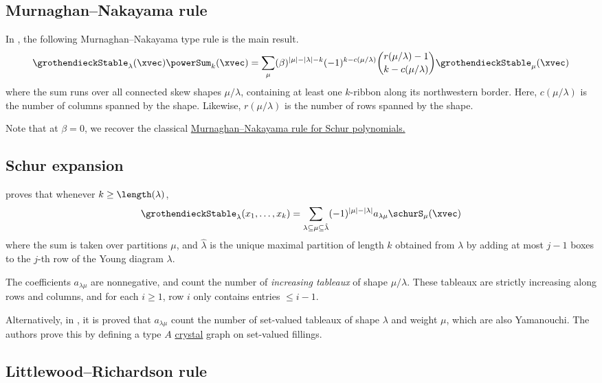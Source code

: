 \subsection[grothendieckStableMN]{Murnaghan--Nakayama rule}

In \cite{NguyenHiepSonThuy2023}, the following Murnaghan--Nakayama type rule is the main result.
\begin{align}
\grothendieckStable_\lambda(\xvec) \powerSum_k(\xvec) =
 \sum_{\mu} (\beta)^{|\mu|-|\lambda|-k} (-1)^{k-c(\mu/\lambda)} \binom{r(\mu/\lambda)-1}{k-c(\mu/\lambda)}
 \grothendieckStable_\mu(\xvec)
 \end{align}
where the sum runs over all connected skew shapes $\mu/\lambda$,
containing at least one $k$-ribbon along its northwestern border.
Here, $c(\mu/\lambda)$ is the number of columns spanned by the shape. Likewise,
$r(\mu/\lambda)$ is the number of rows spanned by the shape.

Note that at $\beta=0$, we recover the classical
\hyperref[murnaghanNakayamaRule]{Murnaghan--Nakayama rule for Schur polynomials.}


\subsection[grothendieckStableSchurExpansion]{Schur expansion}

 proves \cite[Thm.~2.8]{Lenart2000} that whenever $k\geq \length(\lambda)$,
\[
\grothendieckStable_{\lambda}(x_1,\dotsc,x_k)
= \sum_{\lambda \subseteq \mu \subseteq \hat{\lambda}} (-1)^{|\mu|-|\lambda|} a_{\lambda\mu} \schurS_{\mu}(\xvec)
\]
where the sum is taken over partitions $\mu$, and $\hat{\lambda}$ is the unique maximal partition of length $k$
obtained from $\lambda$ by adding at most $j-1$ boxes to the $j$-th row of the Young diagram $\lambda$.

The coefficients $a_{\lambda\mu}$ are nonnegative, and
count the number of \emph{increasing tableaux} of shape $\mu/\lambda$.
These tableaux are strictly increasing along rows and columns,
and for each $i\geq 1$, row $i$ only contains entries $\leq i-1$.


Alternatively, in \cite[Cor.~3.11]{MonicalPechenikScrimshaw2018}, it is proved that
$a_{\lambda\mu}$ count the number of set-valued tableaux of shape $\lambda$ and weight $\mu$,
which are also Yamanouchi. The authors prove this by
defining a type $A$ \hyperref[crystals]{crystal} graph on set-valued fillings.


\subsection[grothendieckStableLittlewoodRichardson]{Littlewood--Richardson rule}

